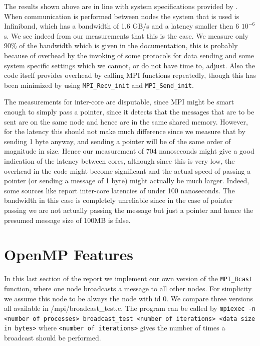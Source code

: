 \documentclass[11pt,a4paper,onecolumn]{article}
\begin{document}
The results shown above are in line with system specifications provided by \cite{LISA}. When communication is performed between nodes the system that is used is Infiniband, which has a bandwidth of 1.6 GB/s and a latency smaller then 6 $10^{-6}$ s. We see indeed from our measurements that this is the case. We measure only 90\% of the bandwidth which is given in the documentation, this is probably because of overhead by the invoking of some protocols for data sending and some system specific settings which we cannot, or do not have time to, adjust. Also the code itself provides overhead by calling MPI functions repeatedly, though this has been minimized by using \texttt{MPI\_Recv\_init} and \texttt{MPI\_Send\_init}.

The measurements for inter-core are disputable, since MPI might be smart enough to simply pass a pointer, since it detects that the messages that are to be sent are on the same node and hence are in the same shared memory. However, for the latency this should not make much difference since we measure that by sending 1 byte anyway, and sending a pointer will be of the same order of magnitude in size. Hence our measurement of 704 nanoseconds might give a good indication of the latency between cores, although since this is very low, the overhead in the code might become significant and the actual speed of passing a pointer (or sending a message of 1 byte) might actually be much larger. Indeed, some sources like \cite{latency} report inter-core latencies of under 100 nanoseconds. The bandwidth in this case is completely unreliable since in the case of pointer passing we are not actually passing the message but just a pointer and hence the presumed message size of 100MB is false.

\section{OpenMP Features}
In this last section of the report we implement our own version of the \texttt{MPI\_Bcast} function, where one node broadcasts a message to all other nodes. For simplicity we assume this node to be always the node with id 0. We compare three versions all available in /mpi/broadcast\_test.c. The program can be called by \texttt{mpiexec -n <number of processes> broadcast\_test <number of iterations> <data size in bytes>} where \texttt{<number of iterations>} gives the number of times a broadcast should be performed.
\end{document}
